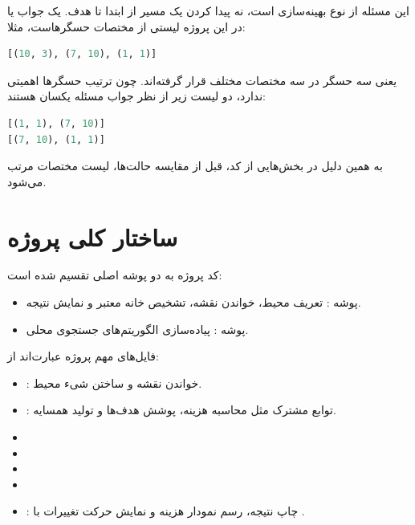 \documentclass[10.5pt]{exam}
\begin{document}
این مسئله از نوع بهینه‌سازی است، نه پیدا کردن یک مسیر از ابتدا تا هدف. یک جواب یا
در این پروژه لیستی از مختصات حسگرهاست، مثلا:

\begin{latin}
\begin{lstlisting}[language=Python]
[(10, 3), (7, 10), (1, 1)]
\end{lstlisting}
\end{latin}

یعنی سه حسگر در سه مختصات مختلف قرار گرفته‌اند. چون ترتیب حسگرها اهمیتی ندارد، دو لیست زیر از نظر جواب مسئله یکسان هستند:

\begin{latin}
\begin{lstlisting}[language=Python]
[(1, 1), (7, 10)]
[(7, 10), (1, 1)]
\end{lstlisting}
\end{latin}

به همین دلیل در بخش‌هایی از کد، قبل از مقایسه حالت‌ها، لیست مختصات مرتب می‌شود.

\section{ساختار کلی پروژه}
کد پروژه به دو پوشه اصلی تقسیم شده است:

\begin{itemize}
    \item پوشه : تعریف محیط، خواندن نقشه، تشخیص خانه معتبر و نمایش نتیجه.
    \item پوشه : پیاده‌سازی الگوریتم‌های جستجوی محلی.
\end{itemize}

فایل‌های مهم پروژه عبارت‌اند از:

\begin{itemize}
    \item {}: خواندن نقشه و ساختن شیء محیط.
    \item {}: توابع مشترک مثل محاسبه هزینه، پوشش هدف‌ها و تولید همسایه.
    \item {}
    \item {}
    \item {}
    \item {}
    \item {}: چاپ نتیجه، رسم نمودار هزینه و نمایش حرکت تغییرات با .
\end{itemize}
\end{document}
